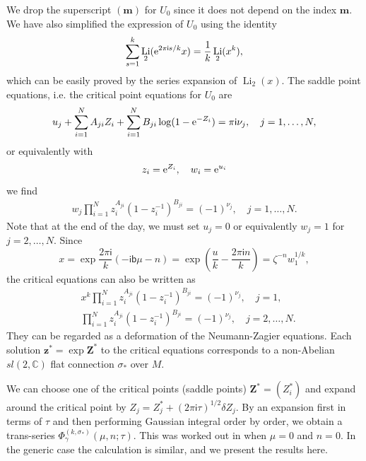 \documentclass[a4paper,11pt]{article}	%
\DeclareMathOperator{\Li}{Li}
\def\ms{\mathsf}
\def\IC{\mathbb{C}}
\newcommand{\re}{{\rm e}}
\newcommand{\ri}{{\mathsf{i}}}
\newcommand{\bb}{\ms{b}}
\newcommand{\s}{\sigma}
\begin{document}
We drop the superscript $(\pmb{m})$ for $U_0$ since it does not depend
on the index $\pmb{m}$. We have also simplified the expression of
$U_0$ using the identity
\begin{equation}
  \sum_{s=1}^k \Li_2(\re^{2\pi \ri s/k}x) = \frac{1}{k}\Li_2(x^k),
\end{equation}
which can be easily proved by the series expansion of $\Li_2(x)$.  The
saddle point equations, i.e. the critical point equations for $U_0$
are
\begin{align}
  u_j + \sum_{i=1}^N A_{ji}Z_i + \sum_{i=1}^N B_{ji}
  \log(1-\re^{-Z_i}) = \pi\ri \nu_j,\quad j=1,\ldots,N,
  \label{eq:cr-eq-u}
\end{align}
or equivalently with
\begin{equation}
  z_i = \re^{Z_i},\quad w_i = \re^{u_i}
\end{equation}
we find
\begin{align}
  w_j \prod_{i=1}^N z_i^{A_{ji}}(1-z_i^{-1})^{B_{ji}} =
  (-1)^{\nu_j},\quad
  j=1,\ldots,N.
  \label{eq:cr-eq-w}
\end{align}
Note that at the end of the day, we must set $u_j=0$ or equivalently
$w_j = 1$ for $j=2,\ldots,N$.
Since
\begin{equation}
  x = \exp\frac{2\pi\ri}{k}\left(-\ri\bb\mu-n\right) =
  \exp \left(\frac{u}{k} - \frac{2\pi\ri n}{k}\right)
  = \zeta^{-n} w_1^{1/k},
\end{equation}
the critical equations can also be written as
\begin{subequations}
  \begin{align}
    &x^k\prod_{i=1}^N z_i^{A_{ji}}(1-z_i^{-1})^{B_{ji}} =
      (-1)^{\nu_j},\quad
      j=1,
      \label{eq:cr-eq-x1}\\
    &\prod_{i=1}^N z_i^{A_{ji}}(1-z_i^{-1})^{B_{ji}} =
      (-1)^{\nu_j},\quad
      j=2,\ldots,N.
      \label{eq:cr-eq-x2}
  \end{align}
\end{subequations}
They can be regarded as a deformation of the Neumann-Zagier
equations. Each solution $\pmb{z}^* = \exp \pmb{Z}^*$ to the critical
equations corresponds to a non-Abelian $sl(2,\IC)$ flat connection
$\sigma_*$ over $M$.

We can choose one of the critical points (saddle points)
$\pmb{Z}^* = (Z_i^*)$ and expand around the critical point by
$Z_j = Z_j^* + (2\pi\ri\tau)^{1/2} \delta Z_j$.  By an expansion first
in terms of $\tau$ and then performing Gaussian integral order by
order, we obtain a trans-series
$\Phi_{\gamma}^{(k,\s_*)}(\mu,n;\tau)$.  This was worked out in
\cite{Dimofte:2015kkp} when $\mu=0$ and $n=0$.  In the generic case
the calculation is similar, and we present the results here.
\end{document}
